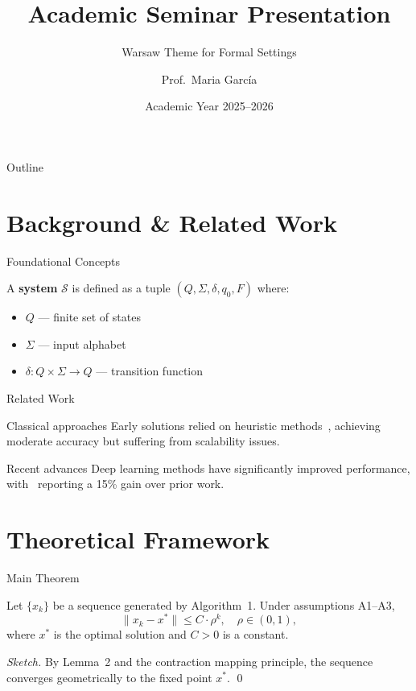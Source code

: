 \documentclass[aspectratio=169]{beamer}
\title{Academic Seminar Presentation}
\subtitle{Warsaw Theme for Formal Settings}
\author{Prof.\ Maria García}
\institute{Department of Computer Science \\ University of Example}
\date{Academic Year 2025--2026}
\begin{document}
\begin{frame}
  \titlepage
\end{frame}

\begin{frame}{Outline}
  \tableofcontents
\end{frame}

\section{Background \& Related Work}

\begin{frame}{Foundational Concepts}
  \begin{definition}
    A \textbf{system} $\mathcal{S}$ is defined as a tuple $(Q, \Sigma, \delta, q_0, F)$ where:
    \begin{itemize}
      \item $Q$ --- finite set of states
      \item $\Sigma$ --- input alphabet
      \item $\delta : Q \times \Sigma \to Q$ --- transition function
    \end{itemize}
  \end{definition}
\end{frame}

\begin{frame}{Related Work}
  \begin{block}{Classical approaches}
    Early solutions relied on heuristic methods~\cite{example2020}, achieving moderate accuracy
    but suffering from scalability issues.
  \end{block}

  \begin{block}{Recent advances}
    Deep learning methods have significantly improved performance, with~\cite{modern2024}
    reporting a 15\% gain over prior work.
  \end{block}
\end{frame}

\section{Theoretical Framework}

\begin{frame}{Main Theorem}
  \begin{theorem}[Convergence]
    Let $\{x_k\}$ be a sequence generated by Algorithm~1. Under assumptions A1--A3,
    \[
      \|x_k - x^*\| \leq C \cdot \rho^k, \quad \rho \in (0,1),
    \]
    where $x^*$ is the optimal solution and $C > 0$ is a constant.
  \end{theorem}

  \begin{proof}[Sketch]
    By Lemma~2 and the contraction mapping principle, the sequence converges
    geometrically to the fixed point $x^*$.  \qed
  \end{proof}
\end{frame}
\end{document}
